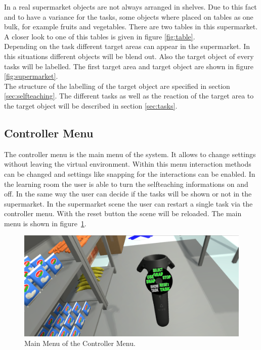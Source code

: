 In a real supermarket objects are not always arranged in shelves. Due to this fact and to have a variance for the tasks,  some objects where placed on tables as one bulk, for example fruits and vegetables. There are two tables in this supermarket. A closer look to one of this tables is given in figure \ref{fig:table}.\\
Depending on the task different target areas can appear in the supermarket. In this situations different objects will be blend out. Also the target object of every tasks will be labelled. The first target area and target object are shown in figure \ref{fig:supermarket}.\\
 The structure of the labelling of the target object are specified in section \ref{sec:selfteaching}.
The different tasks as well as the reaction of the target area to the target object will be described in section \ref{sec:tasks}.

\subsection{Controller Menu} \label{sec:Menu}
The controller menu is the main menu of the system. It allows to change settings without leaving the virtual environment. Within this menu interaction methods can be changed and settings like snapping for the interactions can be enabled. In the learning room	the user is able to turn the selfteaching informations on and off. In the same way the user can decide if the tasks will be shown or not in the supermarket. In the supermarket scene the user can restart a single task via the controller menu. With the reset button the scene will be reloaded. The main menu is shown in figure~\ref{fig:mainMenu}.

\begin{figure}[H] 
	\center 
	\includegraphics[width=12cm]{Images/Menu1.PNG}
	\caption[Main Menu of the Controller Menu.]{Main Menu of the Controller Menu.}
	\label{fig:mainMenu}
\end{figure}

